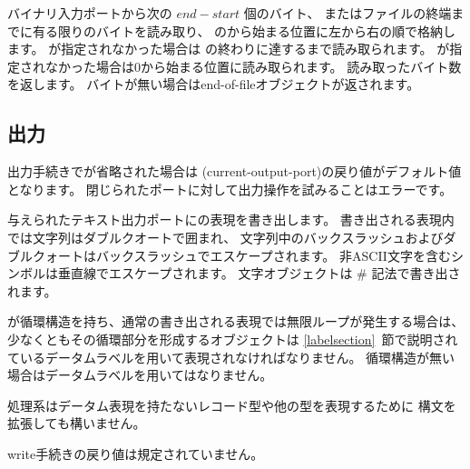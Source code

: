 \begin{entry}{%
}

バイナリ入力ポートから次の $end - start$ 個のバイト、
またはファイルの終端までに有る限りのバイトを読み取り、
のから始まる位置に左から右の順で格納します。
が指定されなかった場合は
の終わりに達するまで読み取られます。
が指定されなかった場合は0から始まる位置に読み取られます。
読み取ったバイト数を返します。
バイトが無い場合はend-of-fileオブジェクトが返されます。

\end{entry}


\subsection{出力}
\label{outputsection}

出力手続きでが省略された場合は
{\cf (current-\+output-\+port)}の戻り値がデフォルト値となります。
閉じられたポートに対して出力操作を試みることはエラーです。

\noindent \hbox{}
\vspace{-5ex}

\begin{entry}{%
}

与えられたテキスト出力ポートにの表現を書き出します。
書き出される表現内では文字列はダブルクオートで囲まれ、
文字列中のバックスラッシュおよびダブルクォートはバックスラッシュでエスケープされます。
非ASCII文字を含むシンボルは垂直線でエスケープされます。
文字オブジェクトは {\cf \#\backwhack} 記法で書き出されます。

が循環構造を持ち、通常の書き出される表現では無限ループが発生する場合は、
少なくともその循環部分を形成するオブジェクトは
\ref{labelsection}~節で説明されているデータムラベルを用いて表現されなければなりません。
循環構造が無い場合はデータムラベルを用いてはなりません。

処理系はデータム表現を持たないレコード型や他の型を表現するために
構文を拡張しても構いません。

{\cf write}手続きの戻り値は規定されていません。

\end{entry}

